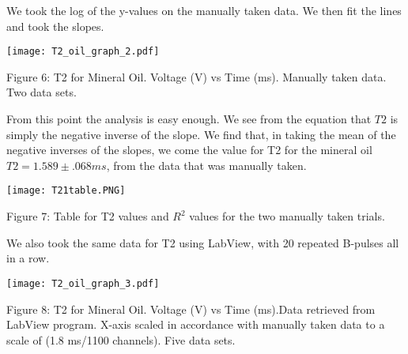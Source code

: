 \documentclass{article}
\begin{document}
    We took the log of the y-values on the manually taken data. We then fit the lines and took the slopes.
    
    \bigskip
    
    \begin{figure6}
    \centering    
    \texttt{[image: T2\_oil\_graph\_2.pdf]}
    \par
    \centering
    \par
    \caption{Figure 6: T2 for Mineral Oil. Voltage (V) vs Time (ms). Manually taken data. Two data sets.}
    \par
    \end{figure6}
    \bigksip
    
    \bigskip
From this point the analysis is easy enough. We see from the equation that $T2$ is simply the negative inverse of the slope. We find that, in taking the mean of the negative inverses of the slopes, we come the value for T2 for the mineral oil $T2 = 1.589 \pm .068 ms$, from the data that was manually taken.
       \bigskip
       
        \begin{figure67889}
    \centering    
    \texttt{[image: T21table.PNG]}
    \par
    \centering
    \par
    \caption{Figure 7: Table for T2 values and $R^{2}$ values for the two manually taken trials.}
    \par
    \end{figure67889}
    \bigksip
    
     \bigksip
    
    \par
    
    \bigskip
    
    We also took the same data for T2 using LabView, with 20 repeated B-pulses all in a row. 
    
    \bigskip
    
    \begin{figure9}
    \centering    
    \texttt{[image: T2\_oil\_graph\_3.pdf]}
    \par
    \centering
    \par
    \caption{Figure 8: T2 for Mineral Oil. Voltage (V) vs Time (ms).Data retrieved from LabView program. X-axis scaled in accordance with manually taken data to a scale of (1.8 ms/1100 channels). Five data sets.}
    \par
    \end{figure9}
    \bigksip
    
\end{document}
